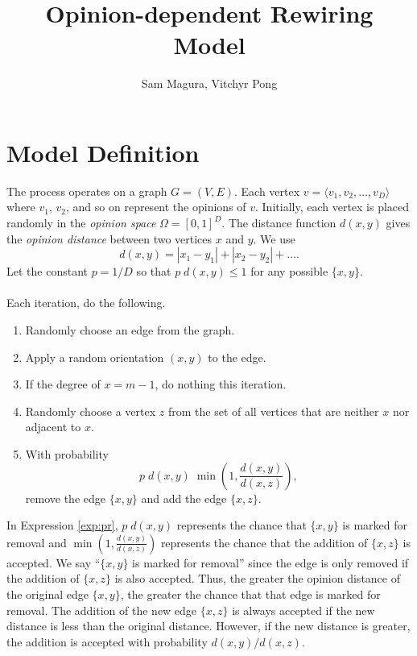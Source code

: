 \documentclass[a4paper,10pt]{article}
\title{Opinion-dependent Rewiring Model}
\author{Sam Magura, Vitchyr Pong}
\begin{document}
\maketitle
\section{Model Definition}
The process operates on a graph $G = (V, E)$. Each vertex $v = \langle v_1, v_2, \ldots, v_D \rangle$ where $v_1$, $v_2$, and so on represent the opinions of $v$. Initially, each vertex is placed randomly in the \emph{opinion space} $\Omega = [0, 1]^D$. The distance function $d(x, y)$ gives the \emph{opinion distance} between two vertices $x$ and $y$. We use
\begin{equation}
 d(x, y) = |x_1 - y_1| + |x_2 - y_2| + \ldots.
\end{equation}
Let the constant $p = 1 / D$ so that $p \; d(x, y) \leq 1$ for any possible $\{x, y\}$.  
\\\\Each iteration, do the following.
\begin{enumerate}
 \item Randomly choose an edge from the graph.
 \item Apply a random orientation $(x, y)$ to the edge.
 \item If the degree of $x = m - 1$, do nothing this iteration.
 \item \label{item:z} Randomly choose a vertex $z$ from the set of all vertices that are neither $x$ nor adjacent to $x$.
 \item With probability
 \begin{equation}
 \label{exp:pr}
  p \; d(x, y) \; \min\left(1, \frac{d(x, y)}{d(x, z)}\right), 
 \end{equation}
remove the edge $\{x, y\}$ and add the edge $\{x, z\}$. 
\end{enumerate}
In Expression \ref{exp:pr}, $p \; d(x, y)$ represents the chance that $\{x, y\}$ is marked for removal and $\min(1, \frac{d(x, y)}{d(x, z)})$ represents the chance that the addition of $\{x, z\}$ is accepted. We say ``$\{x, y\}$ is marked for removal'' since the edge is only removed if the addition of $\{x, z\}$ is also accepted. Thus, the greater the opinion distance of the original edge $\{x, y\}$, the greater the chance that that edge is marked for removal. The addition of the new edge $\{x, z\}$ is always accepted if the new distance is less than the original distance. However, if the new distance is greater, the addition is accepted with probability $d(x, y) / d(x, z).$
\end{document}
